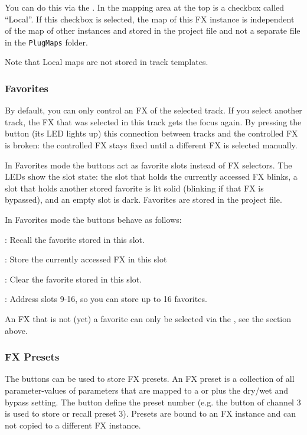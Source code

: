 You can do this via the \mapeditor. In the mapping area at the top is
a checkbox called ``Local''. If this checkbox is selected, the map of
this FX instance is independent of the map of other instances and
stored in the \reaper project file and not a separate file in the
\verb|PlugMaps| folder.

Note that Local maps are not stored in track templates.

\subsubsection{Favorites}\label{fav}

By default, you can only control an FX of the selected track. If you
select another track, the FX that was selected in this track gets the
focus again. By pressing the \gv button (its LED lights up) this
connection between tracks and the controlled FX is broken: the
controlled FX stays fixed until a different FX is selected manually.

In Favorites mode the \select buttons act as favorite slots instead of
FX selectors. The LEDs show the slot state: the slot that holds the
currently accessed FX blinks, a slot that holds another stored
favorite is lit solid (blinking if that FX is bypassed), and an empty
slot is dark. Favorites are stored in the \reaper project file.

In Favorites mode the \select buttons behave as follows:

\begin{compactitem}
\item \select: Recall the favorite stored in this slot.
\item \control: Store the currently accessed FX in this
  slot 
\item \option: Clear the favorite stored in this slot.
\item \shift: Address slots 9-16, so you can store up to 16
  favorites.
\end{compactitem}

An FX that is not (yet) a favorite can only be selected via the
\vpots, see the section above.

\subsubsection{FX Presets}\label{fxpresets}

The \rec buttons can be used to store FX presets. An FX preset is a
collection of all parameter-values of parameters that are mapped to a
\fader or \vpot plus the dry/wet and bypass setting. The \rec button
define the preset number (e.g. the \rec button of channel 3 is used to
store or recall preset 3). Presets are bound to an FX instance and can
not copied to a different FX instance.

